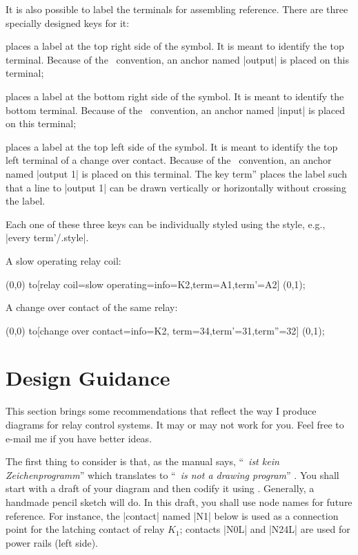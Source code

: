 \documentclass[a4paper]{ltxdoc}
\begin{document}
It is also possible to label the terminals for assembling reference. There are three specially designed keys for it:

\begin{description}[align=right,leftmargin=14mm,labelwidth=12mm,labelsep=2mm]
\item [{term}] places a label at the top right side of the symbol. It is meant to identify the top terminal. Because of the \tikzname\ convention, an anchor named |output| is placed on this terminal;
\item [{term'}] places a label at the bottom right side of the symbol. It is meant to identify the bottom terminal. Because of the \tikzname\ convention, an anchor named |input| is placed on this terminal;
\item [{term''}] places a label at the top left side of the symbol. It is meant to identify the top left terminal of a change over contact. Because of the \tikzname\ convention, an anchor named |output 1| is placed on this terminal. The key term'' places the label such that a line to |output 1| can be drawn vertically or horizontally without crossing the label.
\end{description}
Each one of these three keys can be individually styled using the style, e.g., |every term'/.style|.

A slow operating relay coil:
\begin{codeexample}[width=2.5cm]
  \draw (0,0) to[relay coil={slow operating={info=K2},term=A1,term'=A2}] (0,1);
\end{codeexample}
A change over contact of the same relay:
\begin{codeexample}[width=2.5cm]
  \draw (0,0) to[change over contact={info=K2,
     term=34,term'=31,term''=32}] (0,1);
\end{codeexample}


\section{Design Guidance\label{sec:guidance}}
This section brings some recommendations that reflect the way I produce diagrams for relay control systems. It may or may not work for you. Feel free to e-mail me if you have better ideas.

The first thing to consider is that, as the manual says, ``\tikzname\ \emph{ist kein Zeichenprogramm}'' which translates to ``\tikzname\ \emph{is not a drawing program}'' \cite[p.~27]{Tantau}. You shall start with a draft of your diagram and then codify it using \tikzname. Generally, a handmade pencil sketch will do. In this draft, you shall use node names for future reference. For instance, the |contact| named |N1| below is used as a connection point for the latching contact of relay $K_1$; contacts |N0L| and |N24L| are used for power rails (left side).
\end{document}
